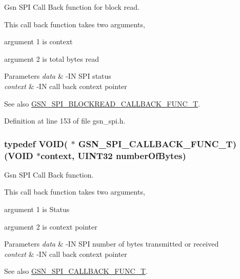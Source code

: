 Gsn SPI Call Back function for block read. 

This call back function takes two arguments,
\begin{DoxyItemize}
\item argument 1 is context
\item argument 2 is total bytes read
\end{DoxyItemize}


\begin{DoxyParams}{Parameters}
{\em data} & -\/IN SPI status \\
\hline
{\em context} & -\/IN call back context pointer \\
\hline
\end{DoxyParams}
\begin{DoxySeeAlso}{See also}
\hyperlink{a00655_ga40c92f454b32d5fffa9780896cecdd02}{GSN\_\-SPI\_\-BLOCKREAD\_\-CALLBACK\_\-FUNC\_\-T}. 
\end{DoxySeeAlso}


Definition at line 153 of file gsn\_\-spi.h.

\hypertarget{a00655_gad27c6db61273e0b521637db94b638cdb}{
\subsubsection[{GSN\_\-SPI\_\-CALLBACK\_\-FUNC\_\-T}]{\setlength{\rightskip}{0pt plus 5cm}typedef VOID( $\ast$ {\bf GSN\_\-SPI\_\-CALLBACK\_\-FUNC\_\-T})(VOID $\ast$context, {\bf UINT32} numberOfBytes)}}
\label{a00655_gad27c6db61273e0b521637db94b638cdb}


Gsn SPI Call Back function. 

This call back function takes two arguments,
\begin{DoxyItemize}
\item argument 1 is Status
\item argument 2 is context pointer
\end{DoxyItemize}


\begin{DoxyParams}{Parameters}
{\em data} & -\/IN SPI number of bytes transmitted or received \\
\hline
{\em context} & -\/IN call back context pointer \\
\hline
\end{DoxyParams}
\begin{DoxySeeAlso}{See also}
\hyperlink{a00655_gad27c6db61273e0b521637db94b638cdb}{GSN\_\-SPI\_\-CALLBACK\_\-FUNC\_\-T}. 
\end{DoxySeeAlso}


